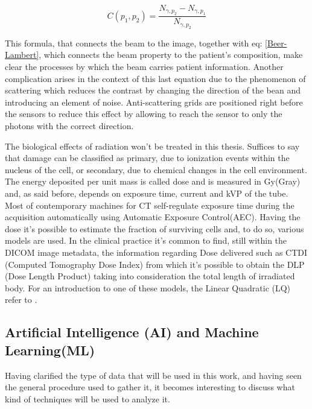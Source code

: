 \begin{equation}
C(p_1,p_2) = \frac{N_{\gamma ,p_2}-N_{\gamma ,p_1}}{N_{\gamma ,p_2}}
\end{equation}

This formula, that connects the beam to the image, together with eq: \ref{Beer-Lambert}, which connects the beam property to the patient's composition, make clear the processes by which the beam carries patient information. Another complication arises in the context of this last equation due to the phenomenon of scattering which reduces the contrast by changing the direction of the bean and introducing an element of noise. Anti-scattering grids are positioned right before the sensors to reduce this effect by allowing to reach the sensor to only the photons with the correct direction.

The biological effects of radiation won't be treated in this thesis. Suffices to say that damage can be classified as primary, due to ionization events within the nucleus of the cell, or secondary, due to chemical changes in the cell environment. The energy deposited per unit mass is called dose and is measured in Gy(Gray) and, as said before, depends on exposure time, current and kVP of the tube. Most of contemporary machines for CT self-regulate exposure time during the acquisition automatically using Automatic Exposure Control(AEC). Having the dose it's possible to estimate the fraction of surviving cells and, to do so, various models are used. In the clinical practice it's common to find, still within the DICOM image metadata, the information regarding Dose delivered such as CTDI (Computed Tomography Dose Index) from which it's possible to obtain the DLP (Dose Length Product) taking into consideration the total length of irradiated body. For an introduction to one of these models, the Linear Quadratic (LQ) refer to \cite{LQ_model}.\newline

\subsection{Artificial Intelligence (AI) and Machine Learning(ML)}
Having clarified the type of data that will be used in this work, and having seen the general procedure used to gather it, it becomes interesting to discuss what kind of techniques will be used to analyze it.

